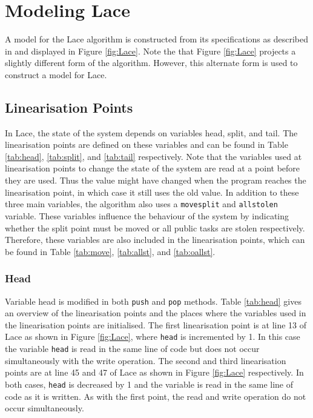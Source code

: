 \documentclass{sig-alternate-br}
\begin{document}
\section{Modeling Lace}
A model for the Lace algorithm is constructed from its specifications as described in \cite{vanDijk2014206} and displayed in Figure \ref{fig:Lace}.
Note the that Figure \ref{fig:Lace} projects a slightly different form of the algorithm.
However, this alternate form is used to construct a model for Lace.

\subsection{Linearisation Points}
In Lace, the state of the system depends on variables head, split, and tail.
The linearisation points are defined on these variables and can be found in Table \ref{tab:head}, \ref{tab:split}, and \ref{tab:tail} respectively.
Note that the variables used at linearisation points to change the state of the system are read at a point before they are used.
Thus the value might have changed when the program reaches the linearisation point, in which case it still uses the old value.
In addition to these three main variables, the algorithm also uses a \texttt{movesplit} and \texttt{allstolen} variable.
These variables influence the behaviour of the system by indicating whether the split point must be moved or all public tasks are stolen respectively.
Therefore, these variables are also included in the linearisation points, which can be found in Table \ref{tab:move}, \ref{tab:allst}, and \ref{tab:oallst}.

\subsubsection{Head}
\label{sec:head}
Variable head is modified in both \texttt{push} and \texttt{pop} methods.
Table \ref{tab:head} gives an overview of the linearisation points and the places where the variables used in the linearisation points are initialised.
The first linearisation point is at line 13 of Lace as shown in Figure \ref{fig:Lace}, where \texttt{head} is incremented by 1.
In this case the variable \texttt{head} is read in the same line of code but does not occur simultaneously with the write operation.
The second and third linearisation points are at line 45 and 47 of Lace as shown in Figure \ref{fig:Lace} respectively.
In both cases, \texttt{head} is decreased by 1 and the variable is read in the same line of code as it is written.
As with the first point, the read and write operation do not occur simultaneously.
\end{document}
